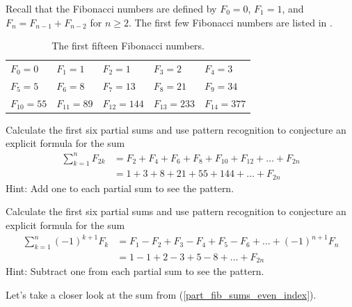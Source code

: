 \begin{act}
\label{act_fib_sums_conj}
    Recall that the Fibonacci numbers are defined by $F_0=0$, $F_1=1$, and $F_n = F_{n-1}+F_{n-2}$ for $n \ge 2$.  The first few Fibonacci numbers are listed in .

        \begin{table}[hbtp]
            \centering
            \begin{tabular}{ll ll l}
                 $F_0=0$ & $F_1=1$ & $F_2=1$ & $F_3=2$ & $F_4=3$ \\ 
                 $F_5=5$ & $F_6=8$ & $F_7=13$ & $F_8=21$ & $F_9=34$ \\ 
                 $F_{10}=55$ & $F_{11}=89$ & $F_{12} = 144$ & $F_{13} = 233$ & $F_{14} = 377$
            \end{tabular}
            \caption{The first fifteen Fibonacci numbers.}
            \label{tab_15fibs}
        \end{table}

    \begin{apart}
        \item \label{part_fib_sums_even_index} Calculate the first six partial sums and use pattern recognition to conjecture an explicit formula for the sum
            \begin{align*}
                \sum_{k=1}^nF_{2k} & = F_2+F_4+F_6+F_8+F_{10}+F_{12}+\ldots +F_{2n} \\
                & = 1+3+8+21+55+144+ \ldots +F_{2n} 
            \end{align*}
        Hint: Add one to each partial sum to see the pattern.
        
        \item \label{part_Fib_sums_alt_act} Calculate the first six partial sums and use pattern recognition to conjecture an explicit formula for the sum
            \begin{align*}
                \sum_{k=1}^n(-1)^{k+1}F_k & = F_1-F_2+F_3-F_4+F_5-F_6+ \ldots +(-1)^{n+1}F_n \\
                & = 1-1+2-3+5-8+ \ldots +F_{2n} 
            \end{align*}
        Hint: Subtract one from each partial sum to see the pattern.
    \end{apart}
\end{act}

Let's take a closer look at the sum from  (\ref{part_fib_sums_even_index}).

